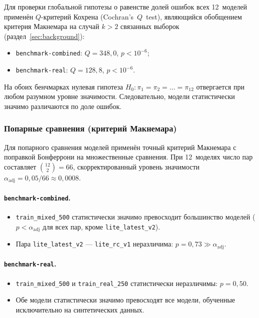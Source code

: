 Для проверки глобальной гипотезы о равенстве долей ошибок всех 12~моделей применён $Q$-критерий Кохрена (Cochran's~$Q$~test), являющийся обобщением критерия Макнемара на случай $k > 2$ связанных выборок (раздел~\ref{sec:background}):

\begin{itemize}
    \item \texttt{benchmark-combined}: $Q = 348{,}0$, $p < 10^{-6}$;
    \item \texttt{benchmark-real}: $Q = 128{,}8$, $p < 10^{-6}$.
\end{itemize}

На обоих бенчмарках нулевая гипотеза $H_0\colon \pi_1 = \pi_2 = \ldots = \pi_{12}$ отвергается при любом разумном уровне значимости. Следовательно, модели статистически значимо различаются по доле ошибок.

\subsubsection{Попарные сравнения (критерий Макнемара)}

Для попарного сравнения моделей применён точный критерий Макнемара с поправкой Бонферрони на множественные сравнения. При 12~моделях число пар составляет $\binom{12}{2} = 66$, скорректированный уровень значимости $\alpha_{\mathrm{adj}} = 0{,}05 / 66 \approx 0{,}0008$.

\paragraph{\texttt{benchmark-combined}.}
\begin{itemize}
    \item \texttt{train\_mixed\_500} статистически значимо превосходит большинство моделей ($p < \alpha_{\mathrm{adj}}$ для всех пар, кроме \texttt{lite\_latest\_v2}).
    \item Пара \texttt{lite\_latest\_v2} --- \texttt{lite\_rc\_v1} неразличима: $p = 0{,}73 \gg \alpha_{\mathrm{adj}}$.
\end{itemize}

\paragraph{\texttt{benchmark-real}.}
\begin{itemize}
    \item \texttt{train\_mixed\_500} и \texttt{train\_real\_250} статистически неразличимы: $p = 0{,}50$.
    \item Обе модели статистически значимо превосходят все модели, обученные исключительно на синтетических данных.
\end{itemize}

